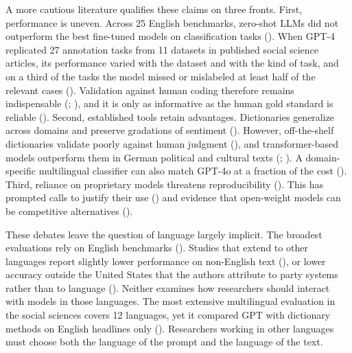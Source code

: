 \documentclass[
  man,
  floatsintext,
  longtable,
  nolmodern,
  notxfonts,
  notimes,
  colorlinks=true,linkcolor=blue,citecolor=blue,urlcolor=blue]{apa7}
\begin{document}
A more cautious literature qualifies these claims on three fronts.
First, performance is uneven. Across 25 English benchmarks, zero-shot
LLMs did not outperform the best fine-tuned models on classification
tasks ().
When GPT-4 replicated 27 annotation tasks from 11 datasets in published
social science articles, its performance varied with the dataset and
with the kind of task, and on a third of the tasks the model missed or
mislabeled at least half of the relevant cases
(). Validation against human coding therefore remains
indispensable (; ), and it is only as informative as the human gold standard is
reliable ().
Second, established tools retain advantages. Dictionaries generalize
across domains and preserve gradations of sentiment
(). However, off-the-shelf dictionaries validate
poorly against human judgment
(),
and transformer-based models outperform them in German political and
cultural texts (;
). A domain-specific multilingual classifier can also match GPT-4o
at a fraction of the cost
(). Third, reliance on proprietary models threatens reproducibility
().
This has prompted calls to justify their use
()
and evidence that open-weight models can be competitive alternatives
().

These debates leave the question of language largely implicit. The
broadest evaluations rely on English benchmarks
(). Studies
that extend to other languages report slightly lower performance on
non-English text
(), or lower accuracy outside the United States that the
authors attribute to party systems rather than to language
().
Neither examines how researchers should interact with models in those
languages. The most extensive multilingual evaluation in the social
sciences covers 12 languages, yet it compared GPT with dictionary
methods on English headlines only
().
Researchers working in other languages must choose both the language of
the prompt and the language of the text.
\end{document}
